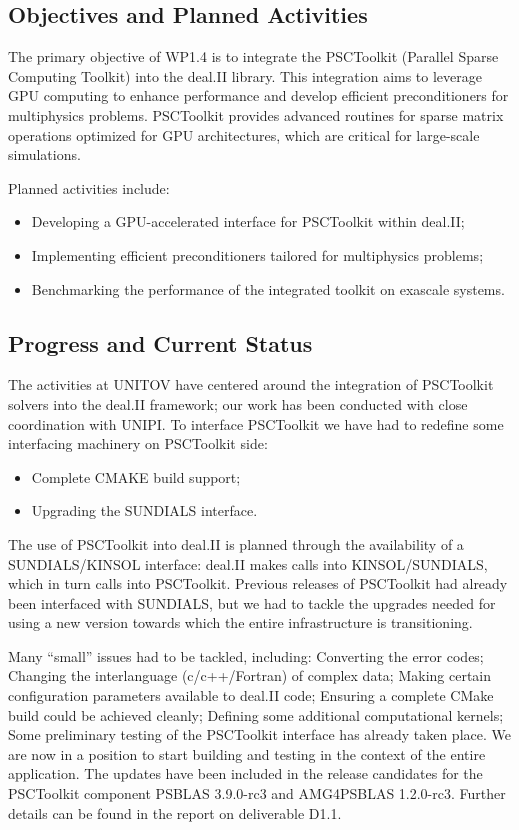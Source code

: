 \documentclass[a4paper,12pt]{article}
\begin{document}
    \subsection{Objectives and Planned Activities}
        The primary objective of WP1.4 is to integrate the PSCToolkit (Parallel Sparse Computing Toolkit) into the deal.II library. This integration aims to leverage GPU computing to enhance performance and develop efficient preconditioners for multiphysics problems. PSCToolkit provides advanced routines for sparse matrix operations optimized for GPU architectures, which are critical for large-scale simulations.

        Planned activities include:
        \begin{itemize}
            \item Developing a GPU-accelerated interface for PSCToolkit within deal.II;
            \item Implementing efficient preconditioners tailored for multiphysics problems;
            \item Benchmarking the performance of the integrated toolkit on exascale systems.
        \end{itemize}

        \subsection{Progress and Current Status}
 
The activities at UNITOV have centered around the integration of PSCToolkit solvers into the deal.II framework; our work has been conducted with close coordination with UNIPI. 
To interface PSCToolkit we have had to 
redefine some interfacing machinery on PSCToolkit side:
\begin{itemize}
\item Complete CMAKE build support;
\item Upgrading the SUNDIALS interface.
\end{itemize}
The use of PSCToolkit into deal.II is planned through the availability of a SUNDIALS/KINSOL interface: deal.II makes calls into KINSOL/SUNDIALS, which in turn calls into PSCToolkit. Previous releases of PSCToolkit had already been interfaced with SUNDIALS, but we had to tackle the upgrades needed for using a new version towards which the entire infrastructure is transitioning. 

Many “small” issues had to be tackled, including: 
Converting the error codes;
Changing the interlanguage (c/c++/Fortran) of complex data;
Making certain configuration parameters available to deal.II code;
Ensuring a complete CMake build could be achieved cleanly;
Defining some additional computational kernels;
Some preliminary testing of the PSCToolkit interface has already taken place.
We are now in a position to start building and testing in the context of the entire application.
The updates have been included in the release candidates for the PSCToolkit component PSBLAS 3.9.0-rc3 and AMG4PSBLAS 1.2.0-rc3. Further details can be found in the report on deliverable D1.1.
\end{document}
